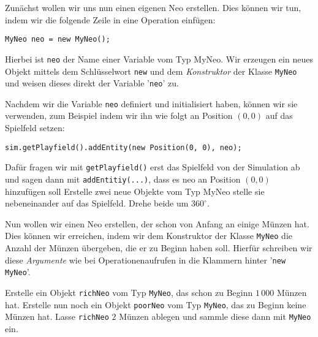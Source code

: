     Zunächst wollen wir uns nun einen eigenen Neo erstellen. Dies können wir tun, indem wir die folgende Zeile in eine Operation einfügen:
    \begin{lstlisting}
MyNeo neo = new MyNeo();
    \end{lstlisting} Hierbei ist \texttt{neo} der Name einer Variable vom Typ MyNeo. Wir erzeugen ein neues Objekt mittels dem Schlüsselwort \lstinline{new} und dem \emph{Konstruktor} der Klasse \texttt{MyNeo} und weisen dieses direkt der Variable '\texttt{neo}' zu.

    Nachdem wir die Variable \lstinline{neo} definiert und initialisiert haben, können wir sie verwenden, zum Beispiel indem wir ihn wie folgt an Position \((0,0)\) auf das Spielfeld setzen:
    \begin{lstlisting}
sim.getPlayfield().addEntity(new Position(0, 0), neo);
    \end{lstlisting}
    Dafür fragen wir mit \texttt{getPlayfield()} erst das Spielfeld von der Simulation ab und sagen dann mit \texttt{addEntitiy(...)}, dass es neo an Position \((0,0)\) hinzufügen soll
    \subexcercise Erstelle zwei neue Objekte vom Typ MyNeo stelle sie nebeneinander auf das Spielfeld. Drehe beide um \(360^\circ\).

    Nun wollen wir einen Neo erstellen, der schon von Anfang an einige Münzen hat. Dies können wir erreichen, indem wir dem Konstruktor der Klasse \lstinline{MyNeo} die Anzahl der Münzen übergeben, die er zu Beginn haben soll. Hierfür schreiben wir diese \emph{Argumente} wie bei Operationenaufrufen in die Klammern hinter '\lstinline{new MyNeo}'.

    \subexcercise Erstelle ein Objekt \lstinline{richNeo} vom Typ \lstinline{MyNeo}, das schon zu Beginn \(1\,000\) Münzen hat.
    \subexcercise Erstelle nun noch ein Objekt \lstinline{poorNeo} vom Typ \lstinline{MyNeo},
    das zu Beginn keine Münzen hat.
    Lasse \lstinline{richNeo} {\(2\)} Münzen ablegen
    und sammle diese dann mit \lstinline{MyNeo} ein.


